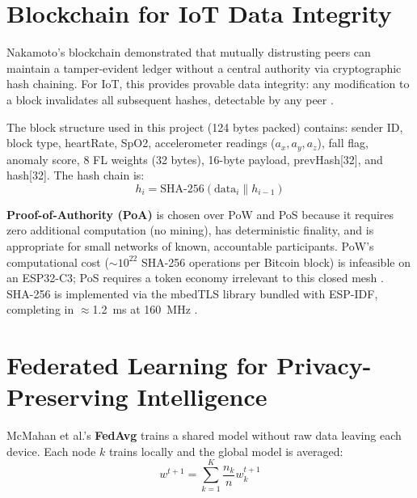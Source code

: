 \section{Blockchain for IoT Data Integrity}

Nakamoto's blockchain \cite{Nakamoto2008} demonstrated that mutually distrusting peers can maintain a tamper-evident ledger without a central authority via cryptographic hash chaining. For IoT, this provides provable data integrity: any modification to a block invalidates all subsequent hashes, detectable by any peer \cite{Kshetri2017}.

The block structure used in this project (124 bytes packed) contains: sender ID, block type, heartRate, SpO2, accelerometer readings ($a_x, a_y, a_z$), fall flag, anomaly score, 8 FL weights (32 bytes), 16-byte payload, prevHash[32], and hash[32]. The hash chain is:
\begin{equation}
h_i = \text{SHA-256}(\text{data}_i \| h_{i-1})
\end{equation}

\textbf{Proof-of-Authority (PoA)} is chosen over PoW and PoS because it requires zero additional computation (no mining), has deterministic finality, and is appropriate for small networks of known, accountable participants. PoW's computational cost ($\sim$$10^{22}$ SHA-256 operations per Bitcoin block) is infeasible on an ESP32-C3; PoS requires a token economy irrelevant to this closed mesh \cite{Puthal2018, deAngelis2018}. SHA-256 is implemented via the mbedTLS library bundled with ESP-IDF, completing in $\approx$1.2~ms at 160~MHz \cite{mbedTLS2023}.

\section{Federated Learning for Privacy-Preserving Intelligence}

McMahan et al.'s \textbf{FedAvg} \cite{McMahan2017} trains a shared model without raw data leaving each device. Each node $k$ trains locally and the global model is averaged:
\begin{equation}
w^{t+1} = \sum_{k=1}^{K} \frac{n_k}{n} w_k^{t+1}
\end{equation}

